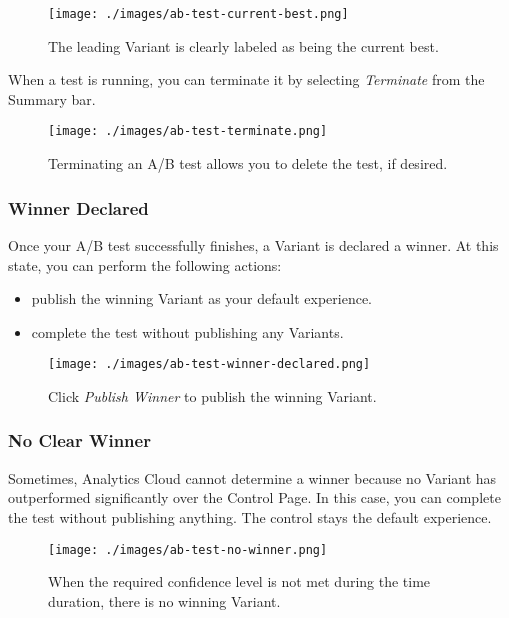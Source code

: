 \begin{figure}
\centering
\texttt{[image: ./images/ab-test-current-best.png]}
\caption{The leading Variant is clearly labeled as being the current
best.}
\end{figure}

When a test is running, you can terminate it by selecting
\emph{Terminate} from the Summary bar.

\begin{figure}
\centering
\texttt{[image: ./images/ab-test-terminate.png]}
\caption{Terminating an A/B test allows you to delete the test, if
desired.}
\end{figure}

\subsubsection{Winner Declared}\label{winner-declared}

Once your A/B test successfully finishes, a Variant is declared a
winner. At this state, you can perform the following actions:

\begin{itemize}
\tightlist
\item
  publish the winning Variant as your default experience.
\item
  complete the test without publishing any Variants.
\end{itemize}

\begin{figure}
\centering
\texttt{[image: ./images/ab-test-winner-declared.png]}
\caption{Click \emph{Publish Winner} to publish the winning Variant.}
\end{figure}

\subsubsection{No Clear Winner}\label{no-clear-winner}

Sometimes, Analytics Cloud cannot determine a winner because no Variant
has outperformed significantly over the Control Page. In this case, you
can complete the test without publishing anything. The control stays the
default experience.

\begin{figure}
\centering
\texttt{[image: ./images/ab-test-no-winner.png]}
\caption{When the required confidence level is not met during the time
duration, there is no winning Variant.}
\end{figure}

